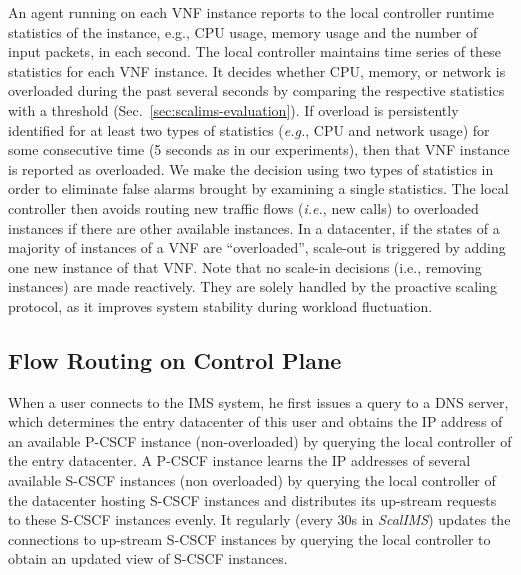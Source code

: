 An agent running on each VNF instance reports to the local controller runtime statistics of the instance, e.g., CPU usage, memory usage and the number of input packets, in each second. The local controller maintains time series of these statistics for each VNF instance. It decides whether CPU, memory, or network is overloaded during the past several seconds by comparing the respective statistics with a threshold (Sec.~\ref{sec:scalims-evaluation}). If overload is persistently identified for at least two types of statistics ({\em e.g.}, CPU and network usage) for some consecutive time (5 seconds as in our experiments), then that VNF instance is reported as overloaded. We make the decision using two types of statistics in order to eliminate false alarms brought by examining a single statistics. The local controller then avoids routing new traffic flows ({\em i.e.}, new calls) to overloaded instances if there are other available instances. In a datacenter, if the states of a majority of instances of a VNF are ``overloaded'', scale-out is triggered by adding one new instance of that VNF. Note that no scale-in decisions (i.e., removing instances) are made reactively. They are solely handled by the proactive scaling protocol, as it improves system stability during workload fluctuation.

\subsection{Flow Routing on Control Plane}
\label{sec:message-routing-on-control-plane}

When a user connects to the IMS system, he first issues a query to a DNS server, which determines the entry datacenter of this user and obtains the IP address of an available P-CSCF instance (non-overloaded) by querying the local controller of the entry datacenter. A P-CSCF instance learns the IP addresses of several available S-CSCF instances (non overloaded) by querying the local controller of the datacenter hosting S-CSCF instances and distributes its up-stream requests to these S-CSCF instances evenly. It regularly (every 30s in \textit{ScalIMS}) updates the connections to up-stream S-CSCF instances by querying the local controller to obtain an updated view of S-CSCF instances.




